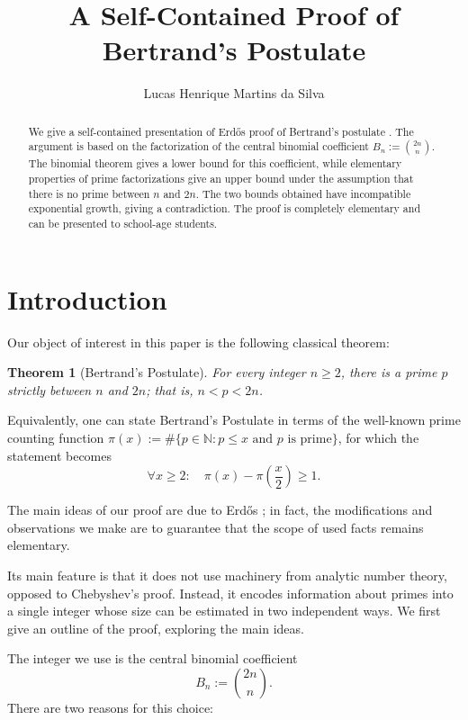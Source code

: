 \documentclass[11pt]{article}
\title{\textbf{A Self-Contained Proof of Bertrand's Postulate}}
\author{Lucas Henrique Martins da Silva}
\date{}
\newtheorem{theorem}{Theorem}[section]
\theoremstyle{remark}
\newcommand{\vs}{\vspace{10px}}
\begin{document}
\maketitle

\begin{abstract}
We give a self-contained presentation of Erd\H{o}s proof of Bertrand's postulate \cite{Erdos1932Tschebyschef}. The argument is based on the
factorization of the central binomial coefficient
$B_n:=\binom{2n}{n}$. The binomial theorem gives a
lower bound for this coefficient, while elementary properties of prime
factorizations give an upper bound under the assumption that there is no
prime between $n$ and $2n$. The two bounds obtained have incompatible exponential growth, giving a contradiction. The proof is completely elementary and can be presented to school-age students.
\end{abstract}


\section{Introduction}
Our object of interest in this paper is the following classical theorem:

\begin{theorem}[Bertrand's Postulate]
    For every integer $n\geq 2$, there is a prime $p$ strictly between $n$ and $2n$; that is, $n<p<2n$. 
\end{theorem}

Equivalently, one can state Bertrand's Postulate in terms of the well-known prime counting function  
$\pi(x):=\#\{p\in \mathbb N: p\le x \text{ and } p \text{ is prime}\}$,
for which the statement becomes \[\forall x\ge 2:\quad \pi(x)-\pi\left(\frac x2\right)\ge 1.\]
\vs 


The main ideas of our proof are due to Erd\H{o}s \cite{Erdos1932Tschebyschef}; in fact, the modifications and observations we make are to guarantee that the scope of used facts remains elementary.

Its main feature is that it does not
use machinery from analytic number theory, opposed to Chebyshev's proof. Instead, it encodes information about
primes into a single integer whose size can be estimated in two independent
ways. We first give an outline of the proof, exploring the main ideas.
\vs

 
The integer we use is the central binomial coefficient \[B_n:=\binom{2n}{n}.\]
There are two reasons for this choice:
\end{document}
